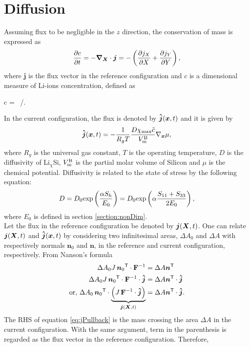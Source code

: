 \section{Diffusion}
Assuming flux to be negligible in the $z$ direction, the conservation of mass is expressed as
\begin{gather}
    \frac{\partial c}{\partial t} = - \bm{\nabla}_{\bm{X}} \cdot \bm{j} = -\left(\frac{\partial j_X}{\partial X} + \frac{\partial j_Y}{\partial Y}\right),
\end{gather}
where $\bm{j}$ is the flux vector in the reference configuration and $c$ is a dimensional measure of Li-ions concentration, defined as 
\begin{nonumbereq}
 c = \tc \, \xmax/\vmb.
\end{nonumbereq}
In the current configuration, the flux is denoted by $\bm{\hat{j}}({\bm{x}}, t)$ and it is given by \citep{2008JMPSHong}
\begin{gather}
    \bm{\hat{j}}({\bm{x}}, t) = -\frac{1}{R_g T} \frac{D \chi_{{\rm{max}}} \tilde{c}}{V_{\rm{m}}^{\rm{B}}} \nabla_{{\bm{x}}} \mu,
\end{gather} 
where $R_g$ is the universal gas constant, $T$ is the operating temperature, $D$ is the diffusivity of Li$_{\chi}$Si, $V_{\rm{m}}^{\rm{B}}$ is the partial molar volume of Silicon and $\mu$ is the chemical potential. Diffusivity is related to the state of stress by the following equation:
\begin{gather} 
 D = D_0 {\rm{exp}}\left(\frac{\alpha S_h}{E_0}\right) = D_0 {\rm{exp}}\left(\alpha \frac{{S}_{11}+{S}_{33}}{2 E_0}\right), 
\end{gather}
where $E_0$ is defined in section \ref{section:nonDim}. \\
Let the flux in the reference configuration be denoted by $\bm{j}({\bm{X}}, t)$. One can relate $\bm{j}({\bm{X}}, t)$ and $\bm{\hat{j}}({\bm{x}}, t)$ by considering two infinitesimal areas, $\Delta A_0$ and $\Delta A$ with respectively normals $\bm{n}_0$ and $\bm{n}$, in the reference and current configuration, respectively. From Nanson's formula 
\begin{align}
     \Delta A_0 J \, {\bm{n}_0}^{{\sf {T}}} \cdot \mathbf{F}^{-1} &= \Delta A {\bm{n}}^{{\sf {T}}} \nonumber \\
    \Delta A_0 J \, {\bm{n}_0}^{{\sf {T}}} \cdot \mathbf{F}^{-1} \cdot \bm{\hat{j}} &= \Delta A {\bm{n}}^{{\sf {T}}} \cdot \bm{\hat{j}} \nonumber \\
    \text{or, }\Delta A_0  \, {\bm{n}_0}^{{\sf {T}}} \cdot \underbrace{\left( J \, \mathbf{F}^{-1} \cdot \bm{\hat{j}} \right)}_{\bm{j}({\bm{X}}, t)} &= \Delta A {\bm{n}}^{{\sf {T}}} \cdot \bm{\hat{j}}. \label{eq:jPullback}
\end{align} The RHS of equation \ref{eq:jPullback} is the mass crossing the area $\Delta A$ in the current configuration. With the same argument, term in the parenthesis is regarded as the flux vector in the reference configuration. Therefore, 
